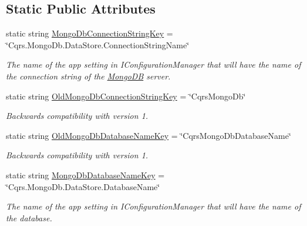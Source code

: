 \subsection*{Static Public Attributes}
\begin{DoxyCompactItemize}
\item 
static string \hyperlink{classCqrs_1_1MongoDB_1_1Factories_1_1MongoDbDataStoreConnectionStringFactory_af6b4a1e2a8dfaa3989ec3c6d0f0803e1_af6b4a1e2a8dfaa3989ec3c6d0f0803e1}{Mongo\+Db\+Connection\+String\+Key} = \char`\"{}Cqrs.\+Mongo\+Db.\+Data\+Store.\+Connection\+String\+Name\char`\"{}
\begin{DoxyCompactList}\small\item\em The name of the app setting in I\+Configuration\+Manager that will have the name of the connection string of the \hyperlink{namespaceCqrs_1_1MongoDB}{Mongo\+DB} server. \end{DoxyCompactList}\item 
static string \hyperlink{classCqrs_1_1MongoDB_1_1Factories_1_1MongoDbDataStoreConnectionStringFactory_a6e2233c3a069a805de1e222e4e11b848_a6e2233c3a069a805de1e222e4e11b848}{Old\+Mongo\+Db\+Connection\+String\+Key} = \char`\"{}Cqrs\+Mongo\+Db\char`\"{}
\begin{DoxyCompactList}\small\item\em Backwards compatibility with version 1. \end{DoxyCompactList}\item 
static string \hyperlink{classCqrs_1_1MongoDB_1_1Factories_1_1MongoDbDataStoreConnectionStringFactory_a91d86af9a5f8eb22a50d1460e084fcea_a91d86af9a5f8eb22a50d1460e084fcea}{Old\+Mongo\+Db\+Database\+Name\+Key} = \char`\"{}Cqrs\+Mongo\+Db\+Database\+Name\char`\"{}
\begin{DoxyCompactList}\small\item\em Backwards compatibility with version 1. \end{DoxyCompactList}\item 
static string \hyperlink{classCqrs_1_1MongoDB_1_1Factories_1_1MongoDbDataStoreConnectionStringFactory_ae0a5d15a403e61d3ce71a8cdabe01525_ae0a5d15a403e61d3ce71a8cdabe01525}{Mongo\+Db\+Database\+Name\+Key} = \char`\"{}Cqrs.\+Mongo\+Db.\+Data\+Store.\+Database\+Name\char`\"{}
\begin{DoxyCompactList}\small\item\em The name of the app setting in I\+Configuration\+Manager that will have the name of the database. \end{DoxyCompactList}\end{DoxyCompactItemize}
